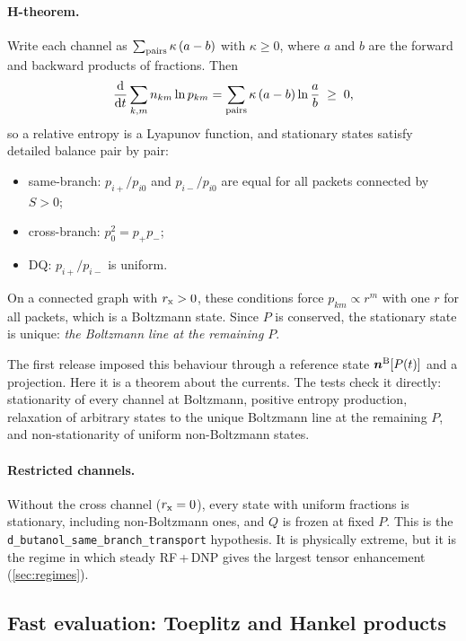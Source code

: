 \documentclass[11pt]{article}
\newcommand{\dd}{\mathrm{d}}
\newcommand{\code}[1]{\texttt{#1}}
\begin{document}
\paragraph{H-theorem.} Write each channel as \(\sum_{\rm pairs}\kappa\,(a-b)\) with
\(\kappa\ge0\), where \(a\) and \(b\) are the forward and backward products of fractions. Then
\begin{equation}
\frac{\dd}{\dd t}\sum_{k,m}n_{km}\ln p_{km} = \sum_{\rm pairs}\kappa\,(a-b)\ln\frac{a}{b}\;\ge\;0,
\label{eq:Htheorem}
\end{equation}
so a relative entropy is a Lyapunov function, and stationary states satisfy detailed balance
pair by pair:
\begin{itemize}
\item same-branch: \(p_{i+}/p_{i0}\) and \(p_{i-}/p_{i0}\) are equal for all packets connected by
\(S>0\);
\item cross-branch: \(p_0^2=p_+p_-\);
\item DQ: \(p_{i+}/p_{i-}\) is uniform.
\end{itemize}
On a connected graph with \(r_{\rm x}>0\), these conditions force \(p_{km}\propto r^m\) with one
\(r\) for all packets, which is a Boltzmann state. Since \(P\) is conserved, the stationary state
is unique: \emph{the Boltzmann line at the remaining \(P\)}.

The first release imposed this behaviour through a reference state \(\bm n^{\rm B}[P(t)]\) and a
projection. Here it is a theorem about the currents. The tests check it directly: stationarity of
every channel at Boltzmann, positive entropy production, relaxation of arbitrary states to the
unique Boltzmann line at the remaining \(P\), and non-stationarity of uniform non-Boltzmann
states.

\paragraph{Restricted channels.} Without the cross channel (\(r_{\rm x}=0\)), every state with
uniform fractions is stationary, including non-Boltzmann ones, and \(Q\) is frozen at fixed \(P\).
This is the \code{d\_butanol\_same\_branch\_transport} hypothesis. It is physically extreme, but
it is the regime in which steady RF\,+\,DNP gives the largest tensor enhancement
(\cref{sec:regimes}).

\subsection{Fast evaluation: Toeplitz and Hankel products}
\label{sec:fft}
\end{document}
